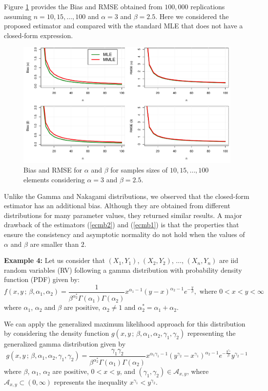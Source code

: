 \documentclass[12pt]{article} %
\theoremstyle{definition}
\begin{document}
Figure \ref{fg3} provides the Bias and RMSE obtained from $100,000$ replications assuming $n=10,15,\ldots,100$ and $\alpha=3$ and $\beta=2.5$. Here we considered the proposed estimator and compared with the standard MLE that does not have a closed-form expression.
\begin{figure}[!ht]
\centering
\includegraphics[scale=0.58]{biasbeta.pdf}	
\caption{Bias and RMSE for $\alpha$ and $\beta$ for samples sizes of $10,15,\ldots,100$ elements considering $\alpha=3$ and $\beta=2.5$.}\label{fg3}
\end{figure}

Unlike the Gamma and Nakagami distributions, we observed that the closed-form estimator has an additional bias. Although they are obtained from different distributions for many parameter values, they returned similar results. A major drawback of the estimators (\ref{ecmb2}) and (\ref{ecmb1}) is that the properties that ensure the consistency and asymptotic normality do not hold when the values of $\alpha$ and $\beta$ are smaller than $2$.

\noindent\textbf{Example 4:} Let us consider that $(X_1,Y_1)$, $(X_2,Y_2)$, $\ldots$, $(X_n,Y_n)$   are iid random variables (RV) following a gamma distribution with probability density function (PDF) given by:
\begin{equation}\label{fdpbigamma}
f(x, y\,;\, \beta,\alpha_1,\alpha_2) = \frac{1}{\beta^{\alpha^*_2}\Gamma(\alpha_1)\Gamma(\alpha_2)} x^{\alpha_1 - 1} (y - x)^{\alpha_2 - 1} e^{-\frac{y}{\beta}},\mbox{ where } 0 < x < y < \infty
\end{equation}
where $\alpha_1$, $\alpha_2$ and $\beta$ are positive, $\alpha_2\neq 1$ and $\alpha_2^*=\alpha_1+\alpha_2$.

We can apply the generalized maximum likelihood approach for this distribution by considering the density function $g(x,y\,;\,\beta,\alpha_1,\alpha_2,\gamma_1,\gamma_2)$ representing the generalized gamma distribution given by
\begin{equation*}g(x,y\,;\,\beta,\alpha_1,\alpha_2,\gamma_1,\gamma_2) = \frac{\gamma_1\gamma_2}{\beta^{\alpha^*_2} \Gamma(\alpha_1)\Gamma(\alpha_2)} x^{\alpha_1\gamma_1-1} \left(y^{\gamma_2} - x^{\gamma_1}\right)^{\alpha_2-1} e^{-\frac{y^{\gamma_2}}{\beta}} y^{\gamma_2 - 1}
\end{equation*}
where $\beta$, $\alpha_1$, $\alpha_2$ are positive, $0<x<y$, and $(\gamma_1, \gamma_2)\in \mathcal{A}_{x,y}$, where $\mathcal{A}_{x,y}\subset (0,\infty)$ represents the inequality $x^{\gamma_1}<y^{\gamma_2}$.
\end{document}
